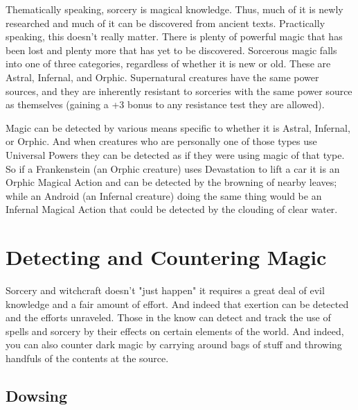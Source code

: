 Thematically speaking, sorcery is magical knowledge. Thus, much of it is newly researched and much of it can be discovered from ancient texts. Practically speaking, this doesn't really matter. There is plenty of powerful magic that has been lost and plenty more that has yet to be discovered. Sorcerous magic falls into one of three categories, regardless of whether it is new or old. These are Astral, Infernal, and Orphic. Supernatural creatures have the same power sources, and they are inherently resistant to  sorceries with the same power source as themselves (gaining a +3 bonus to any resistance test they are allowed).

Magic can be detected by various means specific to whether it is Astral, Infernal, or Orphic. And when creatures who are personally one of those types use Universal Powers they can be detected as if they were using magic of that type. So if a Frankenstein (an Orphic creature) uses Devastation to lift a car it is an Orphic Magical Action and can be detected by the browning of nearby leaves; while an Android (an Infernal creature) doing the same thing would be an Infernal Magical Action that could be detected by the clouding of clear water.

\section{Detecting and Countering Magic}

Sorcery and witchcraft doesn't "just happen" it requires a great deal of evil knowledge and a fair amount of effort. And indeed that exertion can be detected and the efforts unraveled. Those in the know can detect and track the use of spells and sorcery by their effects on certain elements of the world. And indeed, you can also counter dark magic by carrying around bags of stuff and throwing handfuls of the contents at the source.

\subsection{Dowsing} 

